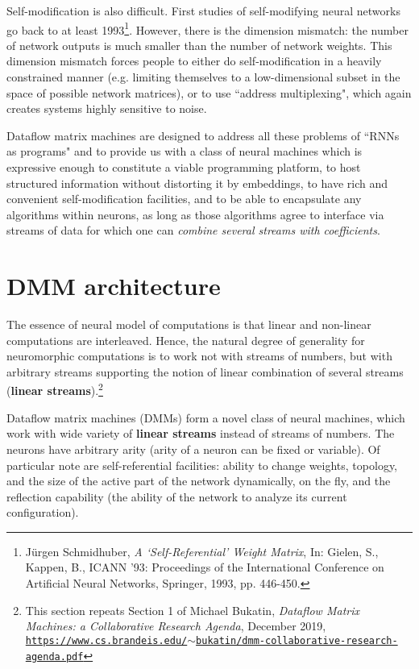 \documentclass{article}
\begin{document}
Self-modification is also difficult. First studies of self-modifying neural networks go back to at least 
1993\footnote{J{\"u}rgen Schmidhuber, {\em A ‘Self-Referential’ Weight Matrix}, In: Gielen, S., Kappen, B., 
ICANN ’93: Proceedings of the International Conference on Artificial Neural Networks, Springer, 1993, pp. 446-450.}.
However, there is the dimension mismatch: the number of network outputs is much smaller than the number of network weights. This dimension mismatch forces people to either do
self-modification in a heavily constrained manner (e.g. limiting themselves to a low-dimensional subset in the space
of possible network matrices), or to use ``address multiplexing", which again creates systems highly sensitive to noise.

Dataflow matrix machines are designed to address all these problems of ``RNNs as programs"
and to provide us with a class of neural machines which is expressive enough to constitute a viable
programming platform, to host structured information without distorting it by embeddings,
to have rich and convenient self-modification facilities, and to be able to encapsulate any algorithms
within neurons, as long as those algorithms agree to interface via streams of data for which one
can {\em combine several streams with coefficients}.


\section{DMM architecture}\label{sec:dmm}

The essence of neural model of computations is that linear and non-linear computations are interleaved. Hence, the natural
degree of generality for neuromorphic computations is to work not with streams of numbers, but with arbitrary streams
supporting the notion of linear combination of several streams ({\bf linear streams}).\footnote{This section repeats Section 1
of Michael Bukatin, {\em Dataflow Matrix Machines:  a Collaborative Research Agenda},
December 2019, \href{https://www.cs.brandeis.edu/~bukatin/dmm-collaborative-research-agenda.pdf}
{\tt https://www.cs.brandeis.edu/$\sim$bukatin/dmm-collaborative-research-agenda.pdf}}


Dataflow matrix machines (DMMs) form a novel class of neural machines, which work with wide variety
of {\bf linear streams} instead of streams of numbers. The neurons have
arbitrary arity (arity of a neuron can be fixed or variable). Of particular note are
self-referential facilities: ability to change weights, topology, and the size of the active part of the network dynamically, on the fly,
and the reflection capability (the ability of the network to analyze its current configuration).
\end{document}
